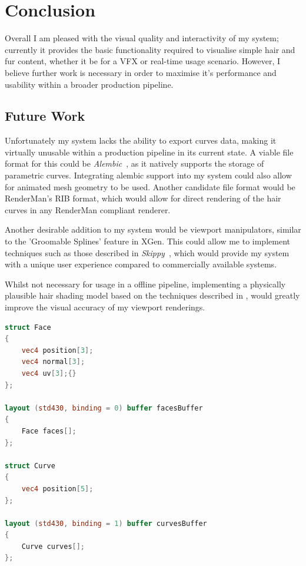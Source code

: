 \documentclass[]{acmsiggraph}
\begin{document}
\section{Conclusion} \label{sec:conclusion}

Overall I am pleased with the visual quality and interactivity of my system; currently it provides the basic functionality required to visualise simple hair and fur content, whether it be for a VFX or real-time usage scenario. However, I believe further work is necessary in order to maximise it's performance and usability within a broader production pipeline.

\subsection{Future Work} \label{sec:futurework}

Unfortunately my system lacks the ability to export curves data, making it virtually unusable within a production pipeline in its current state. A viable file format for this could be \textit{Alembic}~\cite{alembic}, as it natively supports the storage of parametric curves. Integrating alembic support into my system could also allow for animated mesh geometry to be used. Another candidate file format would be RenderMan's RIB format, which would allow for direct rendering of the hair curves in any RenderMan compliant renderer.

Another desirable addition to my system would be viewport manipulators, similar to the 'Groomable Splines' feature in XGen. This could allow me to implement techniques such as those described in \textit{Skippy}~\cite{skippy}, which would provide my system with a unique user experience compared to commercially available systems.

Whilst not necessary for usage in a offline pipeline, implementing a physically plausible hair shading model based on the techniques described in \cite{Marschner}, would greatly improve the visual accuracy of my viewport renderings.

\newpage




\newpage
\appendix

\begin{lstlisting}[language=GLSL, label={lst:buffers}, caption={Extract from the Distributor compute shader, showing how the Mesh and Curves buffers are accessed.}]
struct Face
{
	vec4 position[3];
	vec4 normal[3];
	vec4 uv[3];{}
};

layout (std430, binding = 0) buffer facesBuffer
{
	Face faces[];
};

struct Curve
{
	vec4 position[5];
};

layout (std430, binding = 1) buffer curvesBuffer
{
	Curve curves[];
};
\end{lstlisting}
\end{document}
